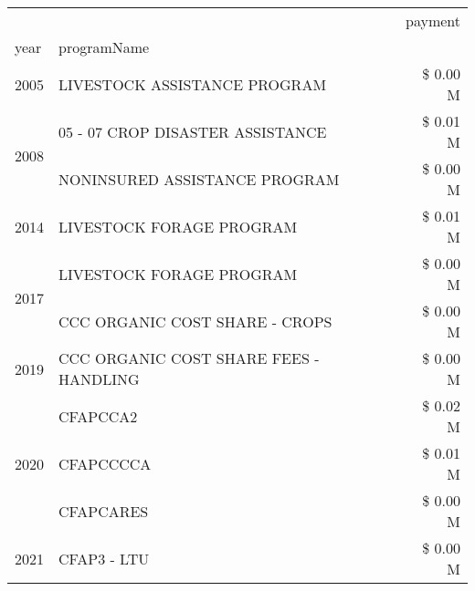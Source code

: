 \begin{tabular}{llr}
\toprule
 &  & payment \\
year & programName &  \\
\midrule
2005 & LIVESTOCK ASSISTANCE PROGRAM & \$ 0.00 M \\
\cline{1-3}
\multirow[t]{2}{*}{2008} & 05 - 07 CROP DISASTER ASSISTANCE & \$ 0.01 M \\
 & NONINSURED ASSISTANCE PROGRAM & \$ 0.00 M \\
\cline{1-3}
2014 & LIVESTOCK FORAGE PROGRAM & \$ 0.01 M \\
\cline{1-3}
\multirow[t]{2}{*}{2017} & LIVESTOCK FORAGE PROGRAM & \$ 0.00 M \\
 & CCC ORGANIC COST SHARE - CROPS & \$ 0.00 M \\
\cline{1-3}
2019 & CCC ORGANIC COST SHARE FEES - HANDLING & \$ 0.00 M \\
\cline{1-3}
\multirow[t]{3}{*}{2020} & CFAPCCA2 & \$ 0.02 M \\
 & CFAPCCCCA & \$ 0.01 M \\
 & CFAPCARES & \$ 0.00 M \\
\cline{1-3}
2021 & CFAP3 - LTU & \$ 0.00 M \\
\cline{1-3}
\bottomrule
\end{tabular}

